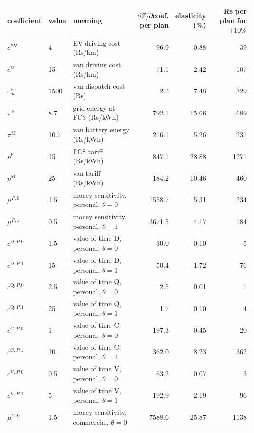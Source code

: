 \begin{tabular}{llp{5.2cm}rrr}\toprule
coefficient & value & meaning & \shortstack{$\partial Z/\partial$coef.\\per plan} & \shortstack{elasticity\\(\%)} & \shortstack{Rs per plan\\for $+10\%$} \\ \midrule
$c^{\mathrm{EV}}$ & 4 & EV driving cost (Rs/km) & 96.9 & 0.88 & 39 \\
$c^{\mathrm{M}}$ & 15 & van driving cost (Rs/km) & 71.1 & 2.42 & 107 \\
$c^{\mathrm{F}}_m$ & 1500 & van dispatch cost (Rs) & 2.2 & 7.48 & 329 \\
$\pi^{\mathrm{F}}$ & 8.7 & grid energy at FCS (Rs/kWh) & 792.1 & 15.66 & 689 \\
$\pi^{\mathrm{M}}$ & 10.7 & van battery energy (Rs/kWh) & 216.1 & 5.26 & 231 \\
$p^{\mathrm{F}}$ & 15 & FCS tariff (Rs/kWh) & 847.1 & 28.88 & 1271 \\
$p^{\mathrm{M}}$ & 25 & van tariff (Rs/kWh) & 184.2 & 10.46 & 460 \\
$\mu^{P,0}$ & 1.5 & money sensitivity, personal, $\theta=0$ & 1558.7 & 5.31 & 234 \\
$\mu^{P,1}$ & 0.5 & money sensitivity, personal, $\theta=1$ & 3671.5 & 4.17 & 184 \\
$c^{\mathrm{D},P,0}$ & 1.5 & value of time D, personal, $\theta=0$ & 30.0 & 0.10 & 5 \\
$c^{\mathrm{D},P,1}$ & 15 & value of time D, personal, $\theta=1$ & 50.4 & 1.72 & 76 \\
$c^{\mathrm{Q},P,0}$ & 2.5 & value of time Q, personal, $\theta=0$ & 2.5 & 0.01 & 1 \\
$c^{\mathrm{Q},P,1}$ & 25 & value of time Q, personal, $\theta=1$ & 1.7 & 0.10 & 4 \\
$c^{\mathrm{C},P,0}$ & 1 & value of time C, personal, $\theta=0$ & 197.3 & 0.45 & 20 \\
$c^{\mathrm{C},P,1}$ & 10 & value of time C, personal, $\theta=1$ & 362.0 & 8.23 & 362 \\
$c^{\mathrm{V},P,0}$ & 0.5 & value of time V, personal, $\theta=0$ & 63.2 & 0.07 & 3 \\
$c^{\mathrm{V},P,1}$ & 5 & value of time V, personal, $\theta=1$ & 192.9 & 2.19 & 96 \\
$\mu^{C,0}$ & 1.5 & money sensitivity, commercial, $\theta=0$ & 7588.6 & 25.87 & 1138 \\

\end{tabular}
